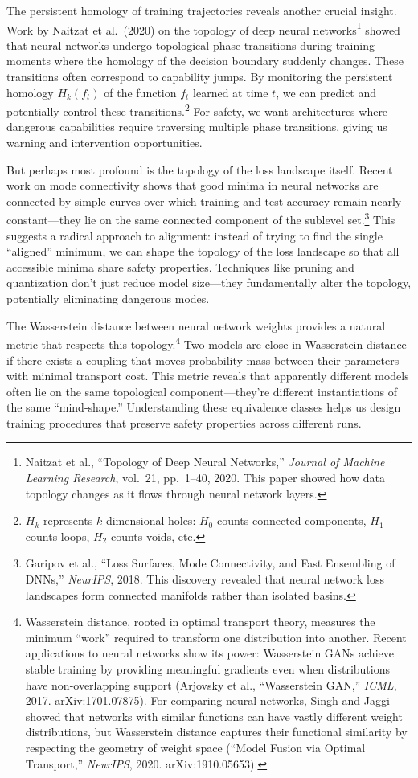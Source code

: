 \documentclass[acmsmall,screen]{acmart}
\begin{document}
The persistent homology of training trajectories reveals another crucial insight. Work by Naitzat et al.\ (2020) on the topology of deep neural networks\footnote{Naitzat et al., ``Topology of Deep Neural Networks,'' \textit{Journal of Machine Learning Research}, vol.\ 21, pp.\ 1--40, 2020. This paper showed how data topology changes as it flows through neural network layers.} showed that neural networks undergo topological phase transitions during training---moments where the homology of the decision boundary suddenly changes. These transitions often correspond to capability jumps. By monitoring the persistent homology $H_k(f_t)$ of the function $f_t$ learned at time $t$, we can predict and potentially control these transitions.\footnote{$H_k$ represents $k$-dimensional holes: $H_0$ counts connected components, $H_1$ counts loops, $H_2$ counts voids, etc.} For safety, we want architectures where dangerous capabilities require traversing multiple phase transitions, giving us warning and intervention opportunities.

But perhaps most profound is the topology of the loss landscape itself.
Recent work on mode connectivity shows that good minima in neural networks are connected by simple curves over which training and test accuracy remain nearly constant---they lie on the same connected component of the sublevel set.\footnote{Garipov et al., ``Loss Surfaces, Mode Connectivity, and Fast Ensembling of DNNs,'' \textit{NeurIPS}, 2018.
This discovery revealed that neural network loss landscapes form connected manifolds rather than isolated basins.}
This suggests a radical approach to alignment: instead of trying to find the single ``aligned'' minimum, we can shape the topology of the loss landscape so that all accessible minima share safety properties.
Techniques like pruning and quantization don't just reduce model size---they fundamentally alter the topology, potentially eliminating dangerous modes.

The Wasserstein distance between neural network weights provides a natural metric that respects this topology.\footnote{Wasserstein distance, rooted in optimal transport theory, measures the minimum ``work'' required to transform one distribution into another. Recent applications to neural networks show its power: Wasserstein GANs achieve stable training by providing meaningful gradients even when distributions have non-overlapping support (Arjovsky et al., ``Wasserstein GAN,'' \textit{ICML}, 2017. arXiv:1701.07875). For comparing neural networks, Singh and Jaggi showed that networks with similar functions can have vastly different weight distributions, but Wasserstein distance captures their functional similarity by respecting the geometry of weight space (``Model Fusion via Optimal Transport,'' \textit{NeurIPS}, 2020. arXiv:1910.05653).}
Two models are close in Wasserstein distance if there exists a coupling that moves probability mass between their parameters with minimal transport cost.
This metric reveals that apparently different models often lie on the same topological component---they're different instantiations of the same ``mind-shape.'' Understanding these equivalence classes helps us design training procedures that preserve safety properties across different runs.
\end{document}
